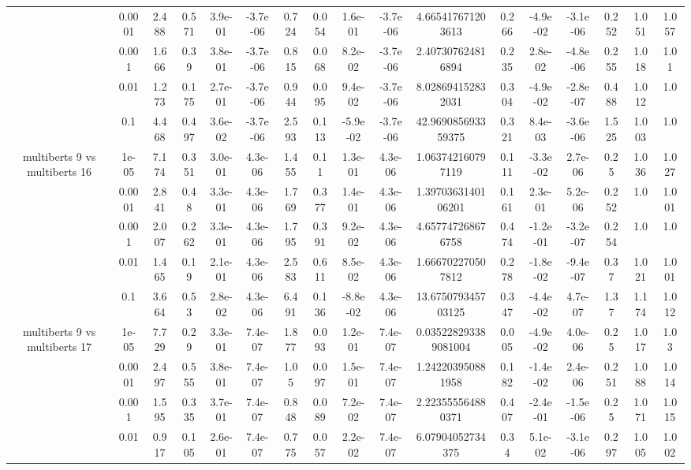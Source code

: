 \begin{tabular}{|c|c|c|c|c|c|c|c|c|c|c|c|c|c|c|c|c|}
 & 0.0001 & 2.488 & 0.571 & 3.9e-01 & -3.7e-06 & 0.724 & 0.054 & 1.6e-01 & -3.7e-06 & 4.665417671203613 & 0.266 & -4.9e-02 & -3.1e-06 & 0.252 & 1.051 & 1.057 \\
 & 0.001 & 1.666 & 0.39 & 3.8e-01 & -3.7e-06 & 0.815 & 0.068 & 8.2e-02 & -3.7e-06 & 2.407307624816894 & 0.235 & 2.8e-02 & -4.8e-06 & 0.255 & 1.018 & 1.01 \\
 & 0.01 & 1.273 & 0.175 & 2.7e-01 & -3.7e-06 & 0.944 & 0.095 & 9.4e-02 & -3.7e-06 & 8.028694152832031 & 0.304 & -4.9e-02 & -2.8e-07 & 0.488 & 1.012 & 1.0 \\
 & 0.1 & 4.468 & 0.497 & 3.6e-02 & -3.7e-06 & 2.593 & 0.113 & -5.9e-02 & -3.7e-06 & 42.969085693359375 & 0.321 & 8.4e-03 & -3.6e-06 & 1.525 & 1.003 & 1.0 \\
\hline
\multirow{5}{*}{multiberts 9 vs multiberts 16} & 1e-05 & 7.174 & 0.351 & 3.0e-01 & 4.3e-06 & 1.455 & 0.11 & 1.3e-01 & 4.3e-06 & 1.063742160797119 & 0.111 & -3.3e-02 & 2.7e-06 & 0.25 & 1.036 & 1.027 \\
 & 0.0001 & 2.841 & 0.48 & 3.3e-01 & 4.3e-06 & 1.769 & 0.377 & 1.4e-01 & 4.3e-06 & 1.3970363140106201 & 0.161 & 2.3e-01 & 5.2e-06 & 0.252 & 1.0 & 1.001 \\
 & 0.001 & 2.007 & 0.262 & 3.3e-01 & 4.3e-06 & 1.795 & 0.391 & 9.2e-02 & 4.3e-06 & 4.657747268676758 & 0.474 & -1.2e-01 & -3.2e-07 & 0.254 & 1.0 & 1.0 \\
 & 0.01 & 1.465 & 0.19 & 2.1e-01 & 4.3e-06 & 2.583 & 0.611 & 8.5e-02 & 4.3e-06 & 1.666702270507812 & 0.278 & -1.8e-02 & -9.4e-07 & 0.37 & 1.021 & 1.001 \\
 & 0.1 & 3.664 & 0.53 & 2.8e-02 & 4.3e-06 & 6.491 & 0.136 & -8.8e-02 & 4.3e-06 & 13.675079345703125 & 0.347 & -4.4e-02 & 4.7e-07 & 1.37 & 1.174 & 1.012 \\
\hline
\multirow{5}{*}{multiberts 9 vs multiberts 17} & 1e-05 & 7.729 & 0.29 & 3.3e-01 & 7.4e-07 & 1.877 & 0.093 & 1.2e-01 & 7.4e-07 & 0.035228293389081004 & 0.005 & -4.9e-02 & 4.0e-06 & 0.25 & 1.017 & 1.03 \\
 & 0.0001 & 2.497 & 0.555 & 3.8e-01 & 7.4e-07 & 1.05 & 0.097 & 1.5e-01 & 7.4e-07 & 1.242203950881958 & 0.182 & -1.4e-02 & 2.4e-06 & 0.251 & 1.088 & 1.014 \\
 & 0.001 & 1.595 & 0.335 & 3.7e-01 & 7.4e-07 & 0.848 & 0.089 & 7.2e-02 & 7.4e-07 & 2.223555564880371 & 0.407 & -2.4e-01 & -1.5e-06 & 0.25 & 1.071 & 1.015 \\
 & 0.01 & 0.917 & 0.105 & 2.6e-01 & 7.4e-07 & 0.775 & 0.057 & 2.2e-02 & 7.4e-07 & 6.07904052734375 & 0.34 & 5.1e-02 & -3.1e-06 & 0.297 & 1.005 & 1.002 \\

\end{tabular}
